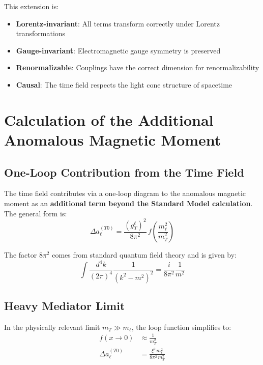\documentclass[12pt,a4paper]{article}
\theoremstyle{definition}
\begin{document}
	This extension is:
	\begin{itemize}
		\item \textbf{Lorentz-invariant}: All terms transform correctly under Lorentz transformations
		\item \textbf{Gauge-invariant}: Electromagnetic gauge symmetry is preserved
		\item \textbf{Renormalizable}: Couplings have the correct dimension for renormalizability
		\item \textbf{Causal}: The time field respects the light cone structure of spacetime
	\end{itemize}
	
	\section{Calculation of the Additional Anomalous Magnetic Moment}
	
	\subsection{One-Loop Contribution from the Time Field}
	
	The time field contributes via a one-loop diagram to the anomalous magnetic moment as an \textbf{additional term beyond the Standard Model calculation}. The general form is\cite{peskin_schroeder_1995}:
	\begin{equation}
		\Delta a_\ell^{(T0)} = \frac{(g_T^\ell)^2}{8\pi^2} \, f\!\left(\frac{m_\ell^2}{m_T^2}\right)
		\label{eq:one_loop_general}
	\end{equation}
	
	The factor $8\pi^2$ comes from standard quantum field theory and is given by:
	\begin{equation}
		\int \frac{d^4k}{(2\pi)^4} \frac{1}{(k^2 - m^2)^2} = \frac{i}{8\pi^2} \frac{1}{m^2}
	\end{equation}
	
	\subsection{Heavy Mediator Limit}
	
	In the physically relevant limit $m_T \gg m_\ell$, the loop function simplifies to:
	\begin{align}
		f(x \to 0) &\approx \frac{1}{m_T^2} \label{eq:heavy_mediator_limit}\\
		\Delta a_\ell^{(T0)} &= \frac{\xi^2 \, m_\ell^2}{8\pi^2 \, m_T^2} \label{eq:anomaly_intermediate}
	\end{align}
	
\end{document}
